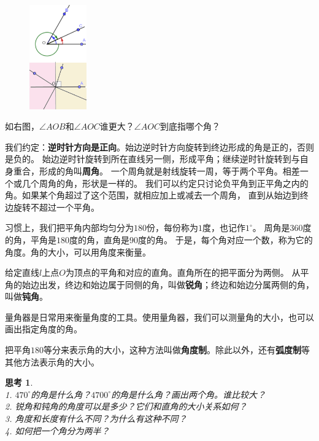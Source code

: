 \documentclass[12pt,UTF8]{ctexbook}
\newtheorem{sk}{思考}[section]
\begin{document}
\begin{figure} %
    \vspace{-10pt}
    \includegraphics[width=0.22\textwidth]{角度1.png}
\end{figure}

如右图，$\angle AOB$和$\angle AOC$谁更大？$\angle AOC$到底指哪个角？

我们约定：\textbf{逆时针方向是正向}。始边逆时针方向旋转到终边形成的角是正的，否则是负的。
始边逆时针旋转到所在直线另一侧，形成平角；继续逆时针旋转到与自身重合，形成的角叫\textbf{周角}。
一个周角就是射线旋转一周，等于两个平角。相差一个或几个周角的角，形状是一样的。
我们可以约定只讨论负平角到正平角之内的角。如果某个角超过了这个范围，就相应加上或减去一个周角，
直到从始边到终边旋转不超过一个平角。

习惯上，我们把平角内部均匀分为$180$份，每份称为$1$度，也记作$1^\circ$。
周角是$360$度的角，平角是$180$度的角，直角是$90$度的角。
于是，每个角对应一个数，称为它的角度。角的大小，可以用角度来衡量。

给定直线$l$上点$O$为顶点的平角和对应的直角。直角所在的把平面分为两侧。
从平角的始边出发，终边和始边属于同侧的角，叫做\textbf{锐角}；终边和始边分属两侧的角，叫做\textbf{钝角}。

量角器是日常用来衡量角度的工具。使用量角器，我们可以测量角的大小，也可以画出指定角度的角。

把平角$180$等分来表示角的大小，这种方法叫做\textbf{角度制}。除此以外，还有\textbf{弧度制}等其他方法表示角的大小。
\begin{sk}\label{sk:0-2-0}
    \mbox{}\\
    1. $470^\circ$的角是什么角？$4700^\circ$的角是什么角？画出两个角。谁比较大？\\
    2. 锐角和钝角的角度可以是多少？它们和直角的大小关系如何？\\
    3. 角度和长度有什么不同？为什么有这种不同？\\
    4. 如何把一个角分为两半？
\end{sk}
\end{document}

